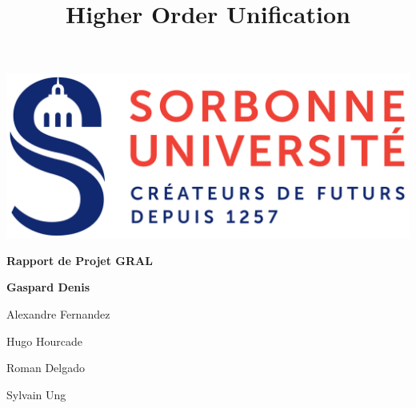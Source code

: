 \begin{titlepage}
\title{Higher Order Unification}
\author{}
\maketitle
\thispagestyle{empty}
\begin{center}
\includegraphics[scale=0.2]{images/logo_sorbonne.png}
\end{center}
\hrulefill
\begin{center}\bfseries\Huge
  Rapport de Projet GRAL
\end{center}
\hrulefill
\vspace*{1cm}
\begin{center}\bfseries\Large
Gaspard Denis

Alexandre Fernandez

Hugo Hourcade

Roman Delgado

Sylvain Ung
\end{center}

\end{titlepage}